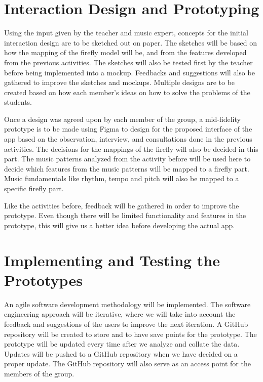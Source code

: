 \section{Interaction Design and Prototyping}
Using the input given by the teacher and music expert, concepts for the initial interaction design are to be sketched out on paper. The sketches will be based on how the mapping of the firefly model will be, and from the features developed from the previous activities. The sketches will also be tested first by the teacher before being implemented into a mockup. Feedbacks and suggestions will also be gathered to improve the sketches and mockups. Multiple designs are to be created based on how each member's ideas on how to solve the problems of the students. 

Once a design was agreed upon by each member of the group, a mid-fidelity prototype is to be made using Figma to design for the proposed interface of the app based on the observation, interview, and consultations done in the previous activities. The decisions for the mappings of the firefly will also be decided in this part. The music patterns analyzed from the activity before will be used here to decide which features from the music patterns will be mapped to a firefly part. Music fundamentals like rhythm, tempo and pitch will also be mapped to a specific firefly part.

Like the activities before, feedback will be gathered in order to improve the prototype. Even though there will be limited functionality and features in the prototype, this will give us a better idea before developing the actual app.

\section{Implementing and Testing the Prototypes}
An agile software development methodology will be implemented. The software engineering approach will be iterative, where we will take into account the feedback and suggestions of the users to improve the next iteration. A GitHub repository will be created to store and to have save points for the prototype. The prototype will be updated every time after we analyze and collate the data. Updates will be pushed to a GitHub repository when we have decided on a proper update. The GitHub repository will also serve as an access point for the members of the group. 

